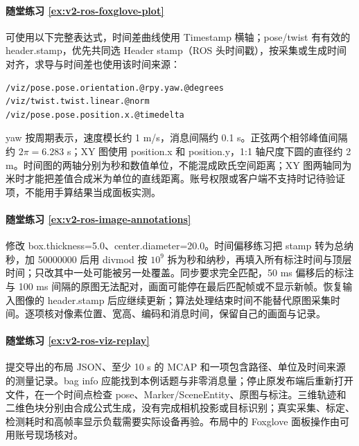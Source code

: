 \paragraph*{随堂练习 \ref{ex:v2-ros-foxglove-plot}}
\begin{solution}
可使用以下完整表达式，时间差曲线使用 Timestamp 横轴；pose/twist 有有效的 header.stamp，优先共同选 Header stamp（ROS 头时间戳），按采集或生成时间对齐，求导与时间差也使用该时间来源：
\begin{lstlisting}[language={}]
/viz/pose.pose.orientation.@rpy.yaw.@degrees
/viz/twist.twist.linear.@norm
/viz/pose.pose.position.x.@timedelta
\end{lstlisting}
yaw 按周期表示，速度模长约 1 m/s，消息间隔约 0.1 s。正弦两个相邻峰值间隔约 $2\pi=6.283$ s；XY 图使用 position.x 和 position.y，1:1 轴尺度下圆的直径约 2 m。时间图的两轴分别为秒和数值单位，不能混成欧氏空间距离；XY 图两轴同为米时才能把差值合成米为单位的直线距离。账号权限或客户端不支持时记待验证项，不能用手算结果当成面板实测。
\end{solution}

\paragraph*{随堂练习 \ref{ex:v2-ros-image-annotations}}
\begin{solution}
修改 box.thickness=5.0、center.diameter=20.0。时间偏移练习把 stamp 转为总纳秒，加 50000000 后用 divmod 按 $10^9$ 拆为秒和纳秒，再填入所有标注时间与顶层时间；只改其中一处可能被另一处覆盖。同步要求完全匹配，50 ms 偏移后的标注与 100 ms 间隔的原图无法配对，画面可能停在最后匹配帧或不显示新帧。恢复输入图像的 header.stamp 后应继续更新；算法处理结束时间不能替代原图采集时间。逐项核对像素位置、宽高、编码和消息时间，保留自己的画面与记录。
\end{solution}

\paragraph*{随堂练习 \ref{ex:v2-ros-viz-replay}}
\begin{solution}
提交导出的布局 JSON、至少 10 s 的 MCAP 和一项包含路径、单位及时间来源的测量记录。bag info 应能找到本例话题与非零消息量；停止原发布端后重新打开文件，在一个时间点检查 pose、Marker/SceneEntity、原图与标注。三维轨迹和二维色块分别由合成公式生成，没有完成相机投影或目标识别；真实采集、标定、检测耗时和高帧率显示负载需要实际设备再验。布局中的 Foxglove 面板操作由可用账号现场核对。
\end{solution}

